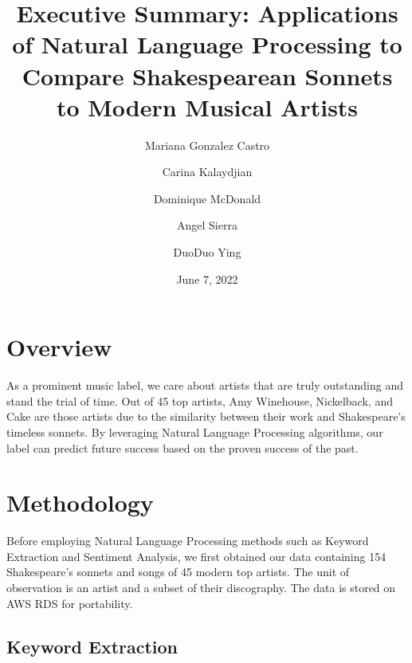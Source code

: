 \documentclass[10pt,a4paper]{article}
\title{Executive Summary: Applications of Natural Language Processing to Compare Shakespearean Sonnets to Modern Musical Artists}
\author[*]{Mariana Gonzalez Castro}
\author[*]{Carina Kalaydjian}
\author[*]{Dominique McDonald}
\author[*]{Angel Sierra}
\author[*]{DuoDuo Ying}
\affil[*]{Department of Statistics, UCLA}
\date{June 7, 2022}
\begin{document}
\maketitle

\section{Overview}

As a prominent music label, we care about artists that are truly outstanding and stand the trial of time. Out of 45 top artists, Amy Winehouse, Nickelback, and Cake are those artists due to the similarity between their work and Shakespeare's timeless sonnets. By leveraging Natural Language Processing algorithms, our label can predict future success based on the proven success of the past. 

\begin{table}[ht]
\centering
{}
\caption{Ranked Top 10 Most Similar Music Artist to Shakespeare} 
\label{tab:overallranktable}
\end{table}


\section{Methodology}

Before employing Natural Language Processing methods such as Keyword Extraction and Sentiment Analysis, we first obtained our data containing 154 Shakespeare's sonnets and songs of 45 modern top artists. The unit of observation is an artist and a subset of their discography. The data is stored on AWS RDS for portability.

\subsection{Keyword Extraction}
\end{document}
